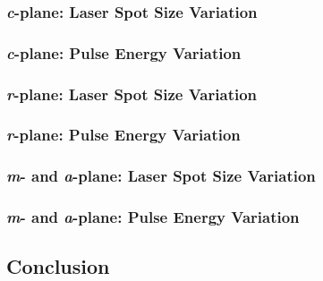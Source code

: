         \subsubsection{\textit{c}-plane: Laser Spot Size Variation}
            
        \subsubsection{\textit{c}-plane: Pulse Energy Variation}
            
        \subsubsection{\textit{r}-plane: Laser Spot Size Variation}
            
        \subsubsection{\textit{r}-plane: Pulse Energy Variation}
            
        \subsubsection{\textit{m}- and \textit{a}-plane: Laser Spot Size Variation}
            
        \subsubsection{\textit{m}- and \textit{a}-plane: Pulse Energy Variation}
            
\subsection{Conclusion}
    